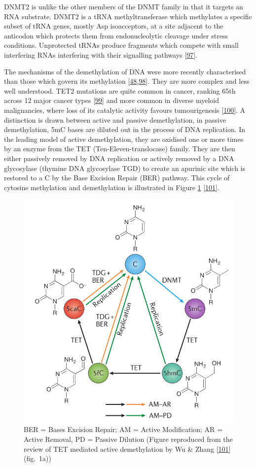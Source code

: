 \documentclass[
]{book}
\begin{document}
DNMT2 is unlike the other members of the DNMT family in that it targets an RNA substrate.
DNMT2 is a tRNA methyltransferase which methylates a specific subset of tRNA genes, mostly Asp isoacceptors, at a site adjacent to the anticodon which protects them from endonucleolytic cleavage under stress conditions.
Unprotected tRNAs produce fragments which compete with small interfering RNAs interfering with their signalling pathways {[}\protect\hyperlink{ref-Kaiser2017}{97}{]}.

The mechanisms of the demethylation of DNA were more recently characterised than those which govern its methylation {[}\protect\hyperlink{ref-Ito2011}{48},\protect\hyperlink{ref-Tahiliani2009}{98}{]}.
They are more complex and less well understood.
TET2 mutations are quite common in cancer, ranking 65th across 12 major cancer types {[}\protect\hyperlink{ref-Kandoth2013}{99}{]} and more common in diverse myeloid malignancies, where loss of its catalytic activity favours tumourigenesis {[}\protect\hyperlink{ref-Ko2010a}{100}{]}.
A distinction is drawn between active and passive demethylation, in passive demethylation, 5mC bases are diluted out in the process of DNA replication.
In the leading model of active demethylation, they are oxidised one or more times by an enzyme from the TET (Ten-Eleven-translocase) family.
They are then either passively removed by DNA replication or actively removed by a DNA glycosylase (thymine DNA glycosylase TGD) to create an apurinic site which is restored to a C by the Base Excision Repair (BER) pathway. This cycle of cytosine methylation and demethylation is illustrated in Figure \ref{fig:Wu2017TETsDNAmCycle} {[}\protect\hyperlink{ref-Wu2017}{101}{]}.

\begin{figure}

{\centering \includegraphics[width=0.6\linewidth]{figs/Wu2017TETsDNAmCycle} 

}

\caption{BER = Bases Excision Repair; AM = Active Modification; AR = Active Removal, PD = Passive Dilution (Figure reproduced from the review of TET mediated active demethylation by Wu \& Zhang {[}\protect\hyperlink{ref-Wu2017}{101}{]} (fig.~1a))}\label{fig:Wu2017TETsDNAmCycle}
\end{figure}
\end{document}
